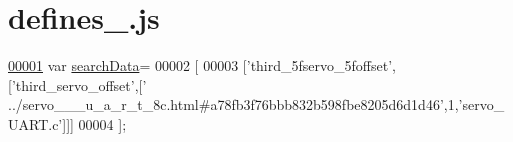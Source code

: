 \hypertarget{defines__10_8js_source}{}\section{defines\+\_.\+js}
\label{defines__10_8js_source}

\begin{DoxyCode}
\hypertarget{defines__10_8js_source.tex_l00001}{}\hyperlink{defines__10_8js_ad01a7523f103d6242ef9b0451861231e}{00001} var \hyperlink{defines__10_8js_ad01a7523f103d6242ef9b0451861231e}{searchData}=
00002 [
00003   [\textcolor{stringliteral}{'third\_5fservo\_5foffset'},[\textcolor{stringliteral}{'third\_servo\_offset'},[\textcolor{stringliteral}{'
      ../servo\_\_\_u\_a\_r\_t\_8c.html#a78fb3f76bbb832b598fbe8205d6d1d46'},1,\textcolor{stringliteral}{'servo\_UART.c'}]]]
00004 ];
\end{DoxyCode}
